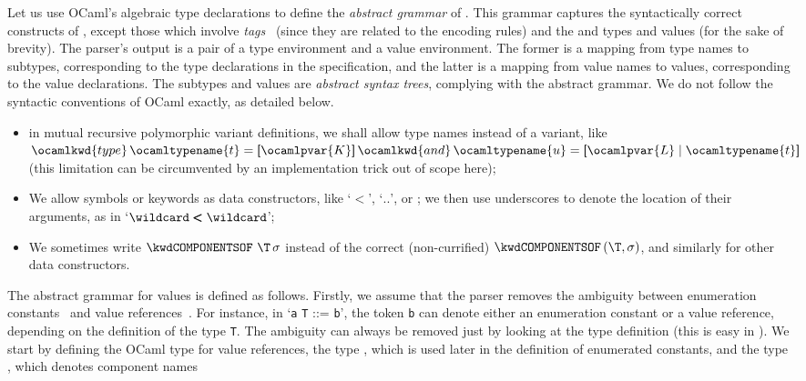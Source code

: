 Let us use OCaml's algebraic type declarations to define the
\emph{abstract grammar} of \core. This grammar captures the
syntactically correct constructs of \core, except those which involve
\emph{tags}~\cite[\S{3.6.69}, \S{8}]{X.680:2002} (since they are
related to the encoding rules) and the \kwdOBJECTIDENTIFIER{} and
\kwdRELATIVEOID{} types and values (for the sake of brevity). The
parser's output is a pair of a type environment and a value
environment. The former is a mapping from type names to subtypes,
corresponding to the type declarations in the \ASN specification, and
the latter is a mapping from value names to values, corresponding to
the value declarations. The subtypes and values are \emph{abstract
syntax trees}, complying with the abstract grammar. We do not follow
the syntactic conventions of OCaml exactly, as detailed below.
\begin{itemize}

  \item in mutual recursive polymorphic variant definitions, we shall
    allow type names instead of a variant, like $\ocamlkwd{type} \,
    \ocamltypename{t} = \textsf{[}\ocamlpvar{K}\textsf{]} \,
    \ocamlkwd{and} \, \ocamltypename{u} = \textsf{[}\ocamlpvar{L} \mid
      \ocamltypename{t}\textsf{]}$ (this limitation can be
    circumvented by an implementation trick out of scope here);

   \item We allow \ASN symbols or keywords as data constructors, like
         `$\pmb{<}$', `$\pmb{..}$', \kwdMINUSINFINITY{} or
         \kwdOCTETSTRING; we then use underscores to 
         denote the location of their arguments, as in 
         `$\wildcard \pmb{<} \wildcard$';

   \item We sometimes write $\kwdCOMPONENTSOF \,\, \T \, \sigma$
     instead of the correct (non-currified) $\kwdCOMPONENTSOF \, (\T,
     \sigma)$, and similarly for other data constructors.

\end{itemize}
The abstract grammar for \core values is defined as follows.  Firstly,
we assume that the parser removes the ambiguity between
enumeration constants~\cite[\S{19}]{X.680:2002} and value
references~\cite[\S{11.4}]{X.680:2002}. For instance, in `\texttt{a}
\texttt{\small T} ::= \texttt{b}', the token \texttt{b} can denote
either an enumeration constant or a value reference, depending on the
definition of the type \texttt{\small T}. The ambiguity can always be
removed just by looking at the type definition (this is easy in
\core). We start by defining the OCaml type  for
value references, the type , which is used
later in the definition of enumerated constants, and the type
, which denotes component names

